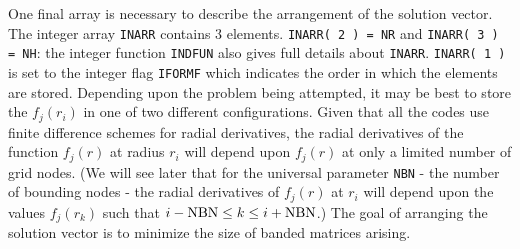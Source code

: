 One final array is necessary to describe the arrangement
of the solution vector. The integer array
\verb+INARR+ contains 3 elements.
\verb+INARR( 2 ) = NR+ and 
\verb+INARR( 3 ) = NH+: the integer function
\verb+INDFUN+ also
gives full details about \verb+INARR+.
\verb+INARR( 1 )+ is set to the integer flag \verb+IFORMF+
which indicates the order in
which the elements are stored. Depending upon the problem
being attempted, it may be best to store the $f_j( r_i )$
in one of two different configurations. Given that
all the codes use finite difference schemes for
radial derivatives, the radial derivatives of
the function $f_j( r )$ at radius $r_i$ will depend
upon $f_j( r )$ at only a limited
number of grid nodes.
(We will see later that for the universal parameter
\verb+NBN+ - the number of bounding nodes - the
radial derivatives of $f_j( r )$ at $r_i$ will depend
upon the values $f_j( r_k )$
such that $i - {\rm NBN} \leq k \leq i + {\rm NBN}$.)
The goal of arranging the solution vector is to minimize
the size of banded matrices arising.


